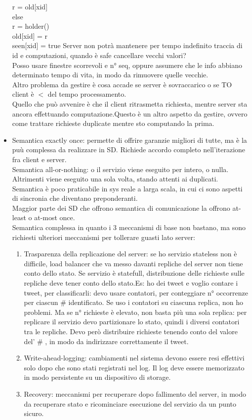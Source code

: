 \documentclass[16px]{article}
\begin{document}
\begin{itemize}
	r = old[xid]\\
else\\
	r = holder()\\
	old[xid] = r\\
	seen[xid] = true
Server non potrà mantenere per tempo indefinito traccia di id e computazioni, quando è safe cancellare vecchi valori?\\Posso usare finestre scorrevoli e n° seq, oppure assumere che le info abbiano determinato tempo di vita, in modo da rimuovere quelle vecchie.\\Altro problema da gestire è cosa accade se server è sovraccarico o se TO client è $<$ del tempo processamento.\\Quello che può avvenire è che il client ritrasmetta richiesta, mentre server sta ancora effettuando computazione.Questo è un altro aspetto da gestire, ovvero come trattare richieste duplicate mentre sto computando la prima.
\item Semantica exactly once: permette di offrire garanzie migliori di tutte, ma è la puù complessa da realizzare in SD. Richiede accordo completo nell'iterazione fra client e server.\\Semantica all-or-nothing: o il servizio viene eseguito per intero, o nulla. Altrimenti viene eseguito una sola volta, stando attenti ai duplicati. Semantica è poco praticabile in sys reale a larga scala, in cui ci sono aspetti di sincronia che diventano preponderanti.\\Maggior parte dei SD che offrono semantica di comunicazione la offrono at-least o at-most once.\\Semantica complessa in quanto i 3 meccanismi di base non bastano, ma sono richiesti ulteriori meccanismi per tollerare guasti lato server:
\begin{enumerate}
\item Trasparenza della replicazione del server: se ho servizio stateless non è difficile, load balancer che va messo davanti repliche del server non tiene conto dello stato. Se servizio è statefull, distribuzione delle richieste sulle repliche deve tener conto dello stato.Es: ho dei tweet e voglio contare i tweet, per classificarli: devo usare contatori, per conteggiare n° occorrenze per ciascun \# identificato. Se uso i contatori su ciascuna replica, non ho problemi. Ma se n° richieste è elevato, non basta più una sola replica: per replicare il servizio devo partizionare lo stato, quindi i diversi contatori tra le repliche. Devo però distribuire richieste tenendo conto del valore del' \# , in modo da indirizzare correttamente il tweet.
\item Write-ahead-logging: cambiamenti nel sistema devono essere resi effettivi solo dopo che sono stati registrati nel log. Il log deve essere memorizzato in modo persistente su un dispositivo di storage.
\item Recovery: meccanismi per recuperare dopo fallimento del server, in modo da recuperare stato e ricominciare esecuzione del servizio da un punto sicuro.
\end{enumerate}
\end{itemize}
\end{document}
